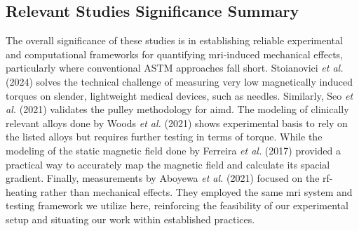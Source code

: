 \subsection{Relevant Studies Significance Summary}
The overall significance of these studies is in establishing reliable experimental and computational frameworks for quantifying \gls{mri}-induced mechanical effects, particularly where conventional ASTM approaches fall short. Stoianovici \textit{et al.} (2024) solves the technical challenge of measuring very low magnetically induced torques on slender, lightweight medical devices, such as needles. Similarly, Seo \textit{et al.} (2021) validates the pulley methodology for \gls{aimd}. The modeling of clinically relevant alloys done by Woods \textit{et al.} (2021) shows experimental basis to rely on the listed alloys but requires further testing in terms of torque. While the modeling of the static magnetic field done by Ferreira \textit{et al.} (2017) provided a practical way to accurately map the magnetic field and calculate its spacial gradient. Finally, measurements by Aboyewa \textit{et al.} (2021) focused on the \gls{rf}-heating rather than mechanical effects. They employed the same \gls{mri} system and testing framework we utilize here, reinforcing the feasibility of our experimental setup and situating our work within established practices.
